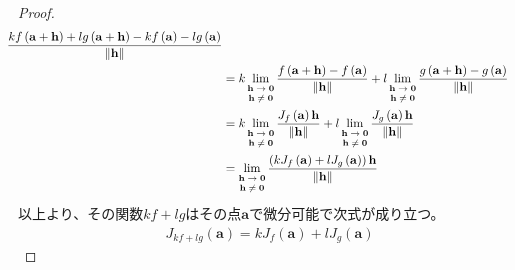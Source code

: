 \documentclass[dvipdfmx]{jsarticle}
\begin{document}
\begin{proof}
\begin{align*}
{\begin{matrix}
\end{matrix}}\frac{kf\left( \mathbf{a} + \mathbf{h} \right) + lg\left( \mathbf{a} + \mathbf{h} \right) - kf\left( \mathbf{a} \right) - lg\left( \mathbf{a} \right)}{\left\| \mathbf{h} \right\|}\\
&= k\lim_{\scriptsize \begin{matrix}
\mathbf{h} \rightarrow \mathbf{0} \\
\mathbf{h} \neq \mathbf{0} \\
\end{matrix}}\frac{f\left( \mathbf{a} + \mathbf{h} \right) - f\left( \mathbf{a} \right)}{\left\| \mathbf{h} \right\|} + l\lim_{\scriptsize \begin{matrix}
\mathbf{h} \rightarrow \mathbf{0} \\
\mathbf{h} \neq \mathbf{0} \\
\end{matrix}}\frac{g\left( \mathbf{a} + \mathbf{h} \right) - g\left( \mathbf{a} \right)}{\left\| \mathbf{h} \right\|}\\
&= k\lim_{\scriptsize \begin{matrix}
\mathbf{h} \rightarrow \mathbf{0} \\
\mathbf{h} \neq \mathbf{0} \\
\end{matrix}}\frac{J_{f}\left( \mathbf{a} \right)\mathbf{h}}{\left\| \mathbf{h} \right\|} + l\lim_{\scriptsize \begin{matrix}
\mathbf{h} \rightarrow \mathbf{0} \\
\mathbf{h} \neq \mathbf{0} \\
\end{matrix}}\frac{J_{g}\left( \mathbf{a} \right)\mathbf{h}}{\left\| \mathbf{h} \right\|}\\
&= \lim_{\scriptsize \begin{matrix}
\mathbf{h} \rightarrow \mathbf{0} \\
\mathbf{h} \neq \mathbf{0} \\
\end{matrix}}\frac{\left( kJ_{f}\left( \mathbf{a} \right) + lJ_{g}\left( \mathbf{a} \right) \right)\mathbf{h}}{\left\| \mathbf{h} \right\|}
\end{align*}
以上より、その関数$kf + lg$はその点$\mathbf{a}$で微分可能で次式が成り立つ。
\begin{align*}
J_{kf + lg}\left( \mathbf{a} \right) = kJ_{f}\left( \mathbf{a} \right) + lJ_{g}\left( \mathbf{a} \right)
\end{align*}\par

\end{proof}
\end{document}
